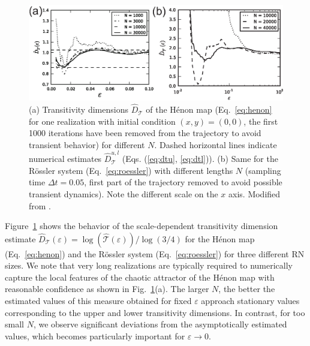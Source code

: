 \begin{figure}
\centering
\includegraphics[width=\columnwidth]{Chapter03_RecurrenceNt/transitivity3_dim_convergence.eps}
\caption{(a) Transitivity dimensions $\hat{D}_{\mathcal{T}}$ of the H\'enon map (Eq.~\ref{eq:henon} for one realization with initial condition $(x, y) = (0, 0)$, the first 1000 iterations have been removed from the trajectory to avoid transient behavior) for different $N$. Dashed horizontal lines indicate numerical estimates $\hat{D}_{\mathcal{T}}^{u, l}$ (Eqs. (\ref{eq:dtu}, \ref{eq:dtl})). (b) Same for the R\"ossler system (Eq.~\ref{eq:roessler}) with different lengths $N$ (sampling time $\Delta t=0.05$, first part of the trajectory removed to avoid possible transient dynamics). Note the different scale on the $x$ axis. Modified from \cite{Donner2011b}. } \label{fig:roessler_transitivity}
\end{figure}
Figure~\ref{fig:roessler_transitivity} shows the behavior of the scale-dependent transitivity dimension estimate $\hat{D}_{\mathcal{T}}(\varepsilon)=\log(\hat{\mathcal{T}}(\varepsilon))/\log(3/4)$ for the H\'enon map (Eq.~\ref{eq:henon}) and the R\"ossler system (Eq.~\ref{eq:roessler}) for three different RN sizes. We note that very long realizations are typically required to numerically capture the local features of the chaotic attractor of the H\'enon map with reasonable confidence as shown in Fig.~\ref{fig:roessler_transitivity}(a). The larger $N$, the better the estimated values of this measure obtained for fixed $\varepsilon$ approach stationary values corresponding to the upper and lower transitivity dimensions. In contrast, for too small $N$, we observe significant deviations from the asymptotically estimated values, which becomes particularly important for $\varepsilon \to 0$.

